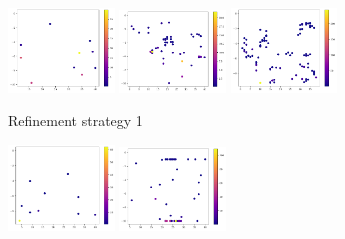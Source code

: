 \begin{figure}[H]
	\begin{subfigure}{\textwidth}
		\centering
		\includegraphics[width=0.31\textwidth]{figures/Adaptive_random/Machine_learning_first/Alternative_0_budget_10}
		\includegraphics[width=0.31\textwidth]{figures/Adaptive_random/Machine_learning_first/Alternative_0_budget_50}
		\includegraphics[width=0.31\textwidth]{figures/Adaptive_random/Machine_learning_first/Alternative_0_budget_100}
		\caption{ Refinement strategy 1 }
		\label{fig:alt0_ml}
	\end{subfigure}
	\begin{subfigure}{\textwidth}
		\centering
		\includegraphics[width=0.31\textwidth]{figures/Adaptive_random/Machine_learning_first/Alternative_1_budget_10}
		\includegraphics[width=0.31\textwidth]{figures/Adaptive_random/Machine_learning_first/Alternative_1_budget_50}

\end{subfigure}
\end{figure}
